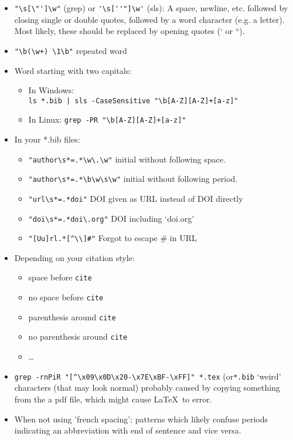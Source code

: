 \begin{itemize}
\begin{itemize}
    \item \verb|"\s[\"']\w"| (grep) or \verb|'\s[''"]\w'| (sls): A space, newline, etc. followed by closing single or double quotes, followed by a word character (e.g. a letter). Most likely, these should be replaced by opening quotes (` or ``).
    \item \verb|"\b(\w+) \1\b"| repeated word
    \item Word starting with two capitals:
    \begin{itemize}
      \item In Windows:\\\verb'ls *.bib | sls -CaseSensitive "\b[A-Z][A-Z]+[a-z]"'
      \item In Linux: \verb|grep -PR "\b[A-Z][A-Z]+[a-z]"|
    \end{itemize}
    \item In your *.bib files:
    \begin{itemize}
      \item \verb|"author\s*=.*\w\.\w"| initial without following space.
      \item \verb|"author\s*=.*\b\w\s\w"| initial without following period.
      \item \verb|"url\s*=.*doi"| DOI given as URL instead of DOI directly
      \item \verb|"doi\s*=.*doi\.org"| DOI including `doi.org'
      \item \verb|"[Uu]rl.*[^\\]#"| Forgot to escape \# in URL
    \end{itemize}
    \item Depending on your citation style:
    \begin{itemize}
      \item space before \verb|cite|
      \item no space before \verb|cite|
      \item parenthesis around \verb|cite|
      \item no parenthesis around \verb|cite|
      \item \ldots
    \end{itemize}
    \item \verb|grep -rnPiR "[^\x09\x0D\x20-\x7E\xBF-\xFF]" *.tex| (or\break\verb|*.bib| `weird' characters (that may look normal) probably caused by copying something from the a pdf file, which might cause \LaTeX\ to error.
    \item When not using 'french spacing': patterns which likely confuse periods indicating an abbreviation with end of sentence and vice versa.

\end{itemize}
\end{itemize}
